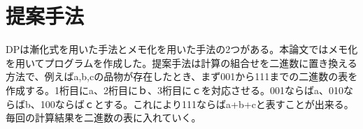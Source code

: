 \chapter{提案手法}
\label{cha:xxx}
DPは漸化式を用いた手法とメモ化を用いた手法の2つがある。本論文ではメモ化を用いてプログラムを作成した。提案手法は計算の組合せを二進数に置き換える方法で、例えばa,b,cの品物が存在したとき、まず001から111までの二進数の表を作成する。1桁目にa、2桁目にｂ、3桁目にｃを対応させる。001ならばa、010ならばb、100ならばｃとする。これにより111ならばa+b+cと表すことが出来る。毎回の計算結果を二進数の表に入れていく。
